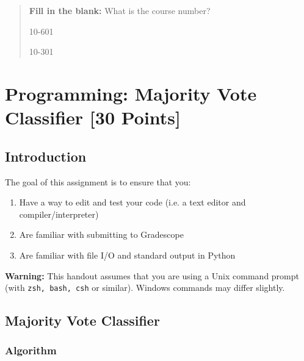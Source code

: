 \documentclass[11pt,addpoints,answers]{exam}
\begin{document}
\begin{quote}
\textbf{Fill in the blank:} What is the course number?

\begin{tcolorbox}[fit,height=1cm, width=4cm, blank, borderline={1pt}{-2pt},nobeforeafter]
    \begin{center}\huge10-601\end{center}
    \end{tcolorbox}\hspace{2cm}
    \begin{tcolorbox}[fit,height=1cm, width=4cm, blank, borderline={1pt}{-2pt},nobeforeafter]
    \begin{center}\huge10-301\end{center}
    \end{tcolorbox}
\end{quote}
\clearpage

\section{Programming: Majority Vote Classifier [30 Points]} 

\subsection{Introduction}
The goal of this assignment is to ensure that you:
\begin{enumerate}
    \item Have a way to edit and test your code (i.e. a text editor and compiler/interpreter)
    \item Are familiar with submitting to Gradescope
    \item Are familiar with file I/O and standard output in Python
\end{enumerate}

\textbf{Warning:} This handout assumes that you are using a Unix command prompt (with \texttt{zsh, bash, csh} or similar). Windows commands may differ slightly.

\subsection{Majority Vote Classifier}

\subsubsection{Algorithm}
\end{document}
